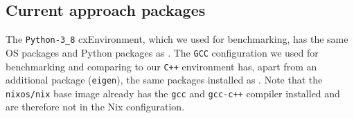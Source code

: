 \subsection{Current approach packages}
The \verb|Python-3_8| cxEnvironment, which we used for benchmarking, has the same OS packages and Python packages as . The \verb|GCC| configuration we used for benchmarking and comparing to our \verb|C++| environment has, apart from an additional package (\verb|eigen|), the same packages installed as . Note that the \verb|nixos/nix| base image already has the \verb|gcc| and \verb|gcc-c++| compiler installed and are therefore not in the Nix configuration. 